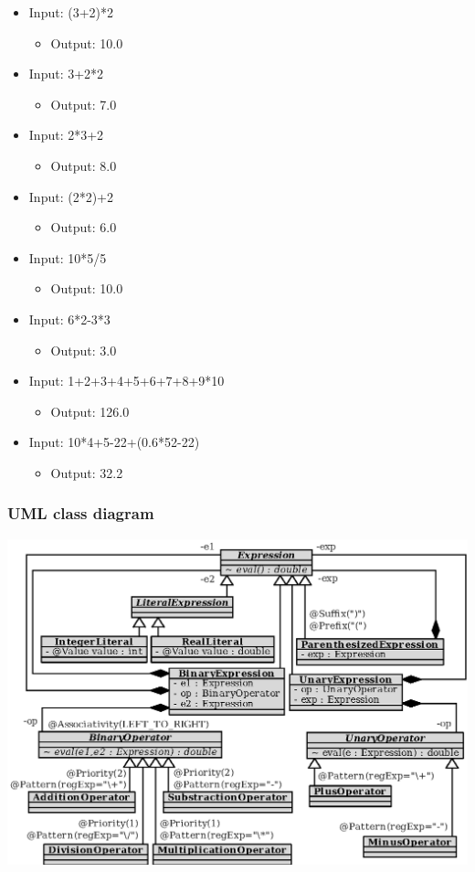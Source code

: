 \documentclass[a4paper,twoside,onecolumn]{article}
\begin{document}
\begin{itemize}
\item Input: (3+2)*2 
\begin{itemize} \item Output: 10.0 \end{itemize}
\item Input: 3+2*2 
\begin{itemize} \item Output: 7.0 \end{itemize}
\item Input: 2*3+2 
\begin{itemize} \item Output: 8.0 \end{itemize}
\item Input: (2*2)+2 
\begin{itemize} \item Output: 6.0 \end{itemize}
\item Input: 10*5/5 
\begin{itemize} \item Output: 10.0 \end{itemize}
\item Input: 6*2-3*3 
\begin{itemize} \item Output: 3.0 \end{itemize}
\item Input: 1+2+3+4+5+6+7+8+9*10 
\begin{itemize} \item Output: 126.0 \end{itemize}
\item Input: 10*4+5-22+(0.6*52-22) 
\begin{itemize} \item Output: 32.2 \end{itemize}
\end{itemize}

\subsubsection{UML class diagram}

\includegraphics[width=1.00\textwidth]{calculator2.eps}\\[-1.5cm]
\end{document}
